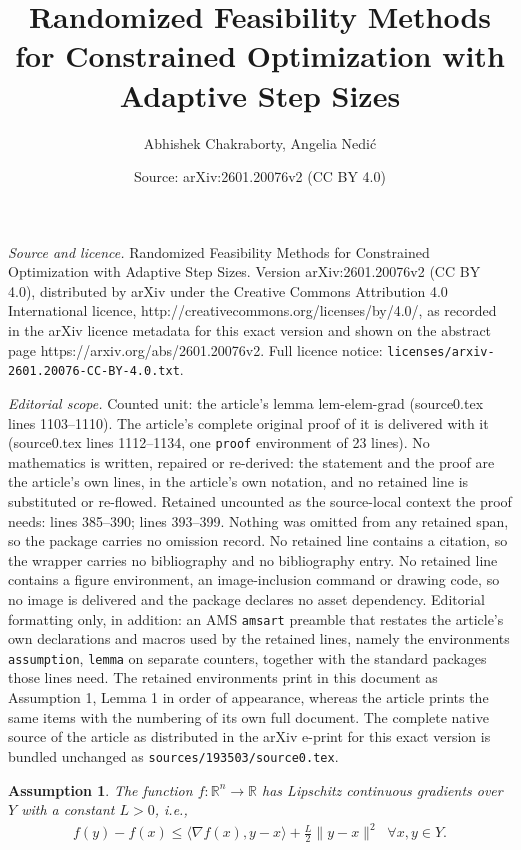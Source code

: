 \documentclass[10pt,a4paper]{amsart}
\title{Randomized Feasibility Methods for Constrained Optimization with Adaptive Step Sizes}
\author{Abhishek Chakraborty, Angelia Nedi\'c}
\date{Source: arXiv:2601.20076v2 (CC BY 4.0)}
\newtheorem{assumption}{Assumption}
\def\la{\langle}
\def\ra{\rangle}
\def\re{\mathbb{R}}
\begin{document}
\maketitle

\noindent\emph{Source and licence.} Randomized Feasibility Methods for Constrained Optimization with Adaptive Step Sizes. Version arXiv:2601.20076v2 (CC BY 4.0), distributed by arXiv under the Creative Commons Attribution 4.0 International licence, http://creativecommons.org/licenses/by/4.0/, as recorded in the arXiv licence metadata for this exact version and shown on the abstract page https://arxiv.org/abs/2601.20076v2. Full licence notice: \texttt{licenses/arxiv-2601.20076-CC-BY-4.0.txt}.\par\smallskip

\noindent\textit{Editorial scope.} Counted unit: the article's lemma lem-elem-grad (source0.tex lines 1103--1110). The article's complete original proof of it is delivered with it (source0.tex lines 1112--1134, one \texttt{proof} environment of 23 lines). No mathematics is written, repaired or re-derived: the statement and the proof are the article's own lines, in the article's own notation, and no retained line is substituted or re-flowed.  Retained uncounted as the source-local context the proof needs: lines 385--390; lines 393--399.  Nothing was omitted from any retained span, so the package carries no omission record.  No retained line contains a citation, so the wrapper carries no bibliography and no bibliography entry.  No retained line contains a figure environment, an image-inclusion command or drawing code, so no image is delivered and the package declares no asset dependency.  Editorial formatting only, in addition: an AMS \texttt{amsart} preamble that restates the article's own declarations and macros used by the retained lines, namely the environments \texttt{assumption}, \texttt{lemma} on separate counters, together with the standard packages those lines need.  The retained environments print in this document as Assumption 1, Lemma 1 in order of appearance, whereas the article prints the same items with the numbering of its own full document.  The complete native source of the article as distributed in the arXiv e-print for this exact version is bundled unchanged as \texttt{sources/193503/source0.tex}.
\begin{assumption}\label{asum_lipschitz}
    The function $f:\re^n\to\re$ has Lipschitz continuous gradients over $Y$ with a constant $L>0$, i.e.,
   \begin{align}
       f(y)-f(x)\le \la \nabla f(x),y-x\ra+\frac{L}{2}\|y-x\|^2 \;\; \forall x,y\in Y. \nonumber
   \end{align}
\end{assumption}
\end{document}
